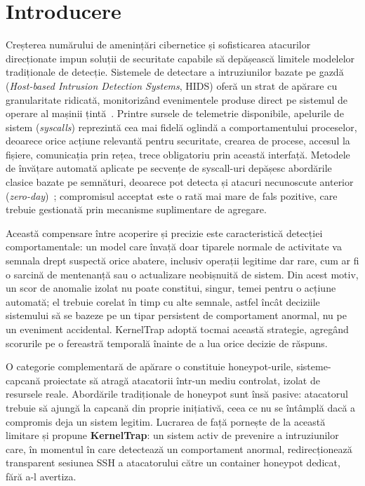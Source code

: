 \documentclass[12pt, a4paper]{report}
\begin{document}
\listoffigures
\newpage

\listoftables
\newpage

\chapter{Introducere}

Creșterea numărului de amenințări cibernetice și sofisticarea atacurilor direcționate impun soluții de securitate capabile să depășească limitele modelelor tradiționale de detecție. 
Sistemele de detectare a intruziunilor bazate pe gazdă (\textit{Host-based Intrusion Detection Systems}, HIDS) oferă un strat de apărare cu granularitate ridicată, 
monitorizând evenimentele produse direct pe sistemul de operare al mașinii țintă~\cite{liu2018hids}. Printre sursele de telemetrie disponibile, apelurile de sistem (\textit{syscalls}) 
reprezintă cea mai fidelă oglindă a comportamentului proceselor, deoarece orice acțiune relevantă pentru securitate, crearea de procese, accesul la fișiere,
comunicația prin rețea, trece obligatoriu prin această interfață. Metodele de învățare automată aplicate pe secvențe de syscall-uri depășesc abordările clasice bazate pe semnături, 
deoarece pot detecta și atacuri necunoscute anterior (\textit{zero-day})~\cite{ring2021deep}; 
compromisul acceptat este o rată mai mare de fals pozitive, care trebuie gestionată prin mecanisme suplimentare de agregare.

Această compensare între acoperire și precizie este caracteristică detecției
comportamentale: un model care învață doar tiparele normale de activitate va
semnala drept suspectă orice abatere, inclusiv operații legitime dar rare, cum
ar fi o sarcină de mentenanță sau o actualizare neobișnuită de sistem. Din acest
motiv, un scor de anomalie izolat nu poate constitui, singur, temei pentru o
acțiune automată; el trebuie corelat în timp cu alte semnale, astfel încât
deciziile sistemului să se bazeze pe un tipar persistent de comportament anormal,
nu pe un eveniment accidental. KernelTrap adoptă tocmai această strategie,
agregând scorurile pe o fereastră temporală înainte de a lua orice decizie de
răspuns.

O categorie complementară de apărare o constituie honeypot-urile, sisteme-capcană proiectate să atragă atacatorii într-un mediu controlat, 
izolat de resursele reale. Abordările tradiționale de honeypot sunt însă pasive: atacatorul trebuie să ajungă la capcană din proprie inițiativă, 
ceea ce nu se întâmplă dacă a compromis deja un sistem legitim. Lucrarea de față pornește de la această limitare și propune \textbf{KernelTrap}: 
un sistem activ de prevenire a intruziunilor care, în momentul în care detectează un comportament anormal, redirecționează transparent sesiunea SSH a 
atacatorului către un container honeypot dedicat, fără a-l avertiza.
\end{document}
